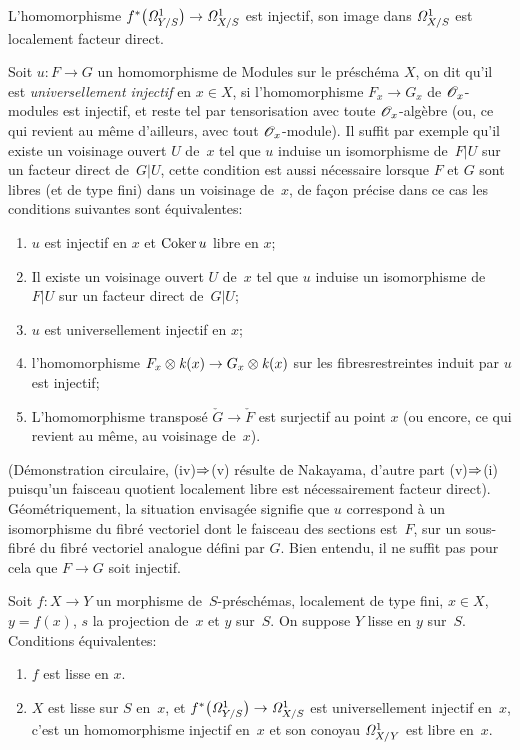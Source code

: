 \begin{corollaire}
\label{II.4.4}
L'homomorphisme
$f^*\big(\it{\Omega}^1_{Y/S}\big)\to\it{\Omega}^1_{X/S}$ est
injectif, son image dans $\it{\Omega}^1_{X/S}$ est localement facteur
direct.
\end{corollaire}

Soit $u\colon F\to G$ un homomorphisme de Modules sur le
pr\'esch\'ema $X$, on dit qu'il est \emph{universellement
injectif}
en $x\in X$, si l'homomorphisme $F_{x}\to G_{x}$ de
$\cal{O}_{x}$-modules est injectif, et reste tel par tensorisation
avec toute $\cal{O}_{x}$-alg\`ebre (ou, ce qui revient au m\^eme
d'ailleurs, avec tout $\cal{O}_{x}$-module). Il suffit par exemple
qu'il existe un voisinage ouvert $U$ de~$x$ tel que $u$ induise un
isomorphisme de~$F|U$ sur un facteur direct de~$G|U$, cette condition
est aussi n\'ecessaire lorsque $F$ et $G$ sont libres (et de type
fini) dans un voisinage de~$x$, de fa\c con pr\'ecise dans ce cas
les conditions suivantes sont \'equivalentes:
\begin{enumerate}
\item[(i)] $u$ est injectif en $x$ et $\Coker u$ libre en $x$;
\item[(ii)] Il existe un voisinage ouvert $U$ de~$x$ tel que $u$
induise un isomorphisme de~$F|U$ sur un facteur direct de~$G|U$;
\item[(iii)] $u$ est universellement injectif en $x$;
\item[(iv)] l'homomorphisme
$F_{x}\otimes \kres(x)\to G_{x}\otimes \kres(x)$
sur les \og fibres\fg restreintes induit par $u$ est injectif;
\item[(v)] L'homomorphisme transpos\'e $\check{G}\to\check{F}$ est
surjectif au point $x$ (ou encore, ce qui revient au m\^eme, au
voisinage de~$x$).
\end{enumerate}
(D\'emonstration circulaire, (iv)$\To$(v) r\'esulte de
Nakayama, d'autre part (v)$\To$(i)
puisqu'un
faisceau
quotient localement libre est n\'ecessairement facteur
direct). G\'eom\'etriquement, la situation envisag\'ee signifie
que $u$ correspond \`a un isomorphisme du fibr\'e vectoriel dont
le faisceau des sections
est~$F$,
sur un sous-fibr\'e du
fibr\'e vectoriel analogue d\'efini par $G$. Bien entendu, il ne
suffit pas pour cela que
$F\to G$
soit injectif.

\begin{corollaire}
\label{II.4.5}
Soit $f\colon X\to Y$ un morphisme de~$S$-pr\'esch\'emas,
localement de type fini, $x\in X$, $y=f(x)$, $s$ la projection de~$x$
et $y$ sur~$S$. On suppose $Y$ lisse en $y$ sur~$S$. Conditions
\'equivalentes:
\begin{enumerate}
\item[(i)] $f$ est lisse en $x$.
\item[(ii)] $X$ est lisse sur
$S$
en~$x$, et
$f^*\big(\it{\Omega}^1_{Y/S}\big)\to\it{\Omega}^1_{X/S}$ est
universellement injectif en~$x$, \ie c'est un homomorphisme injectif en~$x$ et son conoyau $\it{\Omega}^1_{X/Y}$ est libre
en~$x$.
\end{enumerate}
\end{corollaire}

